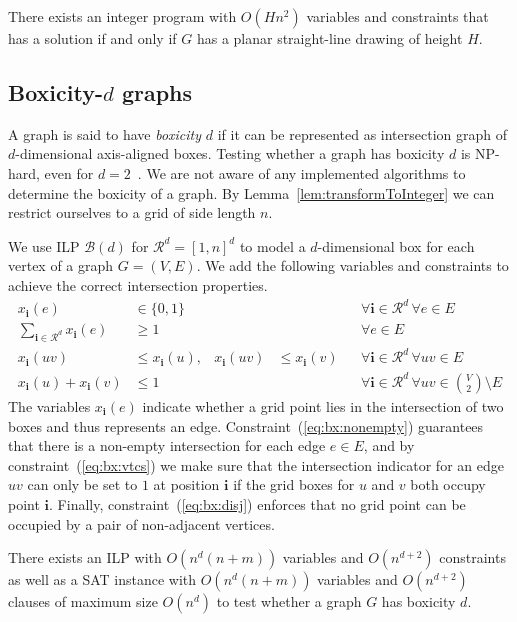 \documentclass[runningheads]{llncs}
\newcommand{\bvec}[1]{\mathbf{#1}}
\newcounter{constr}
\begin{document}
\begin{corollary}
There exists an integer program with $O(Hn^2)$ variables and
constraints that has a solution if and only if $G$  has
a planar straight-line drawing of height $H$.
\end{corollary}

\fi


\subsection{Boxicity-$d$ graphs}\label{sec:boxicity}
A graph is said to have {\em boxicity} $d$ if it can be represented
as intersection graph of $d$-dimensional axis-aligned boxes. Testing
whether a graph has boxicity $d$ is NP-hard, even for
$d=2$~\cite{Kra94}. We are not aware of any implemented algorithms to
determine the boxicity of a graph. By
Lemma~\ref{lem:transformToInteger} we can restrict ourselves to a grid
of side length $n$.

We use ILP $\mathcal B(d)$ for $\mathcal R^d = [1,n]^d$ to model a
$d$-dimensional box for each vertex of a graph $G=(V,E)$. We add the
following variables and constraints to achieve the correct
intersection properties.
\begin{align}
  \label{eq:bx:var} x_\bvec{i}(e) &\in \{0,1\} &&&& \forall \bvec{i}
\in \mathcal R^d\, \forall e \in E\\
  \label{eq:bx:nonempty} \sum_{\bvec{i} \in \mathcal R^d}
x_\bvec{i}(e) &\ge 1 &&&& \forall e \in E\\
  \label{eq:bx:vtcs} x_\bvec{i}(uv) &\le x_\bvec{i}(u), &
x_\bvec{i}(uv) &\le x_\bvec{i}(v) && \forall \bvec{i} \in \mathcal
R^d\, \forall uv \in E\\
  \label{eq:bx:disj} x_\bvec{i}(u) + x_\bvec{i}(v) &\le 1 &&&& \forall
\bvec{i} \in \mathcal R^d\, \forall uv \in \binom{V}{2} \setminus E
\end{align}
The variables $x_\bvec{i}(e)$ indicate whether a grid point lies in
the intersection of two boxes and thus represents an edge.
Constraint~(\ref{eq:bx:nonempty}) guarantees that there is a non-empty
intersection for each edge $e \in E$, and by
constraint~(\ref{eq:bx:vtcs}) we make sure that the intersection
indicator for an edge $uv$ can only be set to $1$ at position
$\bvec{i}$ if the grid boxes for $u$ and $v$ both occupy point
$\bvec{i}$. Finally, constraint~(\ref{eq:bx:disj}) enforces that no
grid point can be occupied by a pair of non-adjacent vertices.



\begin{theorem}
There exists an ILP with $O(n^d (n+m))$ variables and
$O(n^{d+2})$ constraints 
as well as a SAT instance with $O(n^d (n+m))$ variables and
$O(n^{d+2})$ clauses of maximum size $O(n^d)$
to test whether a graph $G$ has boxicity $d$.
\end{theorem}
\end{document}
